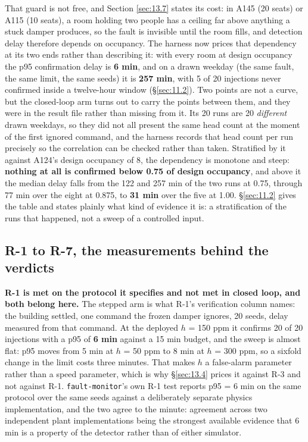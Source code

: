 That guard is not free, and Section \ref{sec:13.7} states its cost: in A145 (20 seats) or A115 (10 seats), a
room holding two people has a ceiling far above anything a stuck damper produces, so the fault is
invisible until the room fills, and detection delay therefore depends on occupancy. The harness now
prices that dependency at its two ends rather than describing it: with every room at design
occupancy the p95 confirmation delay is \textbf{6 min}, and on a drawn weekday (the same fault, the
same limit, the same seeds) it is \textbf{257 min}, with 5 of 20 injections never confirmed inside
a twelve-hour window (§\ref{sec:11.2}). Two points are not a curve, but the closed-loop arm turns out to
carry the points between them, and they were in the result file rather than missing from it. Its
20 runs are 20 \emph{different} drawn weekdays, so they did not all present the same head count at
the moment of the first ignored command, and the harness records that head count per run precisely
so the correlation can be checked rather than taken. Stratified by it against A124's design
occupancy of 8, the dependency is monotone and steep: \textbf{nothing at all is confirmed below
0.75 of design occupancy}, and above it the median delay falls from the 122 and 257 min of the two
runs at 0.75, through 77 min over the eight at 0.875, to \textbf{31 min} over the five at 1.00.
§\ref{sec:11.2} gives the table and states plainly what kind of evidence it is: a stratification of the
runs that happened, not a sweep of a controlled input.

\subsection{R-1 to R-7, the measurements behind the verdicts}\label{sec:F.3}


\textbf{R-1 is met on the protocol it specifies and not met in closed loop, and both belong here.}
The stepped arm is what R-1's verification column names: the building settled, one command the
frozen damper ignores, 20 seeds, delay measured from that command. At the deployed $h$ = 150 ppm it
confirms 20 of 20 injections with a p95 of \textbf{6 min} against a 15 min budget, and the sweep is
almost flat: p95 moves from 5 min at $h$ = 50 ppm to 8 min at $h$ = 300 ppm, so a sixfold change in
the limit costs three minutes. That makes $h$ a false-alarm parameter rather than a speed
parameter, which is why §\ref{sec:13.4} prices it against R-3 and not against R-1.
\texttt{fault-monitor}'s own R-1 test reports p95 = 6 min on the same protocol over the same seeds
against a deliberately separate physics implementation, and the two agree to the minute: agreement
across two independent plant implementations being the strongest available evidence that 6 min is a
property of the detector rather than of either simulator.

